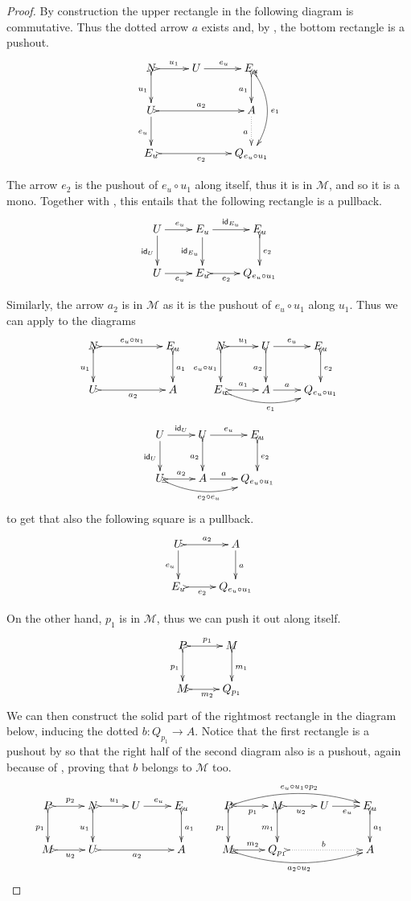 \documentclass[a4paper]{article}
\newcommand{\id}[1]{\mathsf{id}_{#1}}
\theoremstyle{definition}
\begin{document}
\begin{proof}
	By construction the upper rectangle in the following diagram is commutative. Thus the dotted arrow $a$ exists and, by , the bottom rectangle is a pushout.
	\[\xymatrix{N \ar@{>->}[r]^{u_1} \ar@{>->}[d]_{u_1} & U \ar[r]^{e_u} & E_u \ar@{>->}[d]_{a_1} \ar@{>->}@/^.5cm/[dd]^{e_1} \\
		U \ar[d]_{e_u} \ar@{>->}[rr]^{a_2}&& A \ar@{.>}[d]_{a} \\ E_u \ar@{>->}[rr]_{e_2}&&Q_{e_u\circ u_1}}\]

	
	The arrow $e_2$ is the pushout of $e_u\circ u_1$ along itself, thus it is in $\mathcal{M}$, and so it is a mono. Together with , this entails that the following rectangle is a pullback.
	\[\xymatrix{U \ar[r]^{e_u}  \ar[d]_{\id{U}}& E_u \ar[r]^-{\id{E_u}} \ar[d]_{\id{E_u}} & E_u \ar@{>->}[d]^{e_2}\\ U \ar[r]_{e_u} & E_u \ar@{>->}[r]_-{e_2} & Q_{e_u\circ u_1}}\]
	
	Similarly, the arrow $a_2$ is in $\mathcal{M}$ as it is the pushout of $e_u\circ u_1$ along $u_1$. Thus we can apply  to the diagrams
	\[\xymatrix{ N \ar@{>->}[rr]^-{e_u\circ u_1} \ar@{>->}[d]_{ u_1} && E_u \ar@{>->}[d]^{a_1} & N \ar@{>->}[d]_{e_u\circ u_1} \ar@{>->}[r]^{u_1} & U \ar@{>->}[d]_{a_2}\ar[r]^-{e_u} & E_u  \ar@{>->}[d]^{e_2}\\ U \ar@{>->}[rr]_{a_2}&& A & E_u \ar@{>->}@/_.4cm/[rr]_{e_1} \ar@{>->}[r]^{a_1} &  A \ar[r]^-{a} & Q_{e_u\circ u_1} }\]
	\[\xymatrix{U  \ar[r]^{\id{U}} \ar[d]_{\id{U}}& U \ar@{>->}[d]_{a_2} \ar[r]^-{e_u} & E_u \ar@{>->}[d]^{e_2} \\U \ar@{>->}[r]^{a_2} \ar@{>->}@/_.4cm/[rr]_{e_2\circ e_u} & A \ar[r]^-{a} & Q_{e_u\circ u_1}}\]
	to get that also the following square is a pullback.
	\[\xymatrix{
		U \ar[d]_{e_u} \ar@{>->}[r]^-{a_2}& A \ar[d]^{a} \\ E_u \ar@{>->}[r]_-{e_2}&Q_{e_u\circ u_1}}\]
	
	On the other hand,  $p_1$ is in $\mathcal{M}$, thus we can push it out along itself.
	\[\xymatrix{P \ar@{>->}[r]^{p_1} \ar@{>->}[d]_{p_1}& M \ar@{>->}[d]^{m_1} \\ M \ar@{>->}[r]_{m_2} & Q_{p_1}}\]
	We can then construct the solid part of the rightmost rectangle in the diagram below, inducing the dotted $b\colon Q_{p_1}\to A$. Notice that the first rectangle is a pushout by  so that  the right half of the second diagram also is a pushout, again because of , proving that $b$ belongs to $\mathcal{M}$ too.
	\[\xymatrix{P \ar@{>->}[r]^{p_2} \ar@{>->}[d]_{p_1}& N \ar@{>->}[d]_{u_1} \ar@{>->}[r]^{u_1}& U \ar[r]^{e_u} & E_u \ar@{>->}[d]^{a_1} & P \ar@{>->}@/^.4cm/[rrr]^{e_u\circ u_1\circ p_2}\ar@{>->}[r]_{p_1} \ar@{>->}[d]_{p_1}& M \ar@{>->}[d]_{m_1} \ar@{>->}[r]_{u_2}& U \ar[r]_{e_u}& E_u \ar@{>->}[d]^{a_1}\\ M \ar@{>->}[r]_{u_2}& U \ar@{>->}[rr]_{a_2}&& A& M \ar@{>->}@/_.4cm/[rrr]_{a_2\circ u_2}\ar@{>->}[r]^{m_2} & Q_{p_1} \ar@{>.>}[rr]^{b} && A}\]
	

\end{proof}
\end{document}
